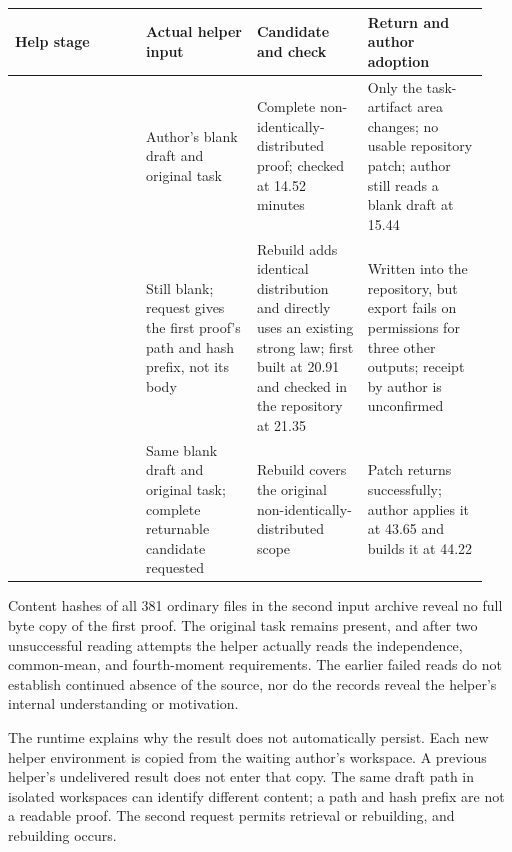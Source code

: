 \begingroup\small\setlength{\tabcolsep}{3pt}\renewcommand{\arraystretch}{1.14}
\par\nopagebreak\medskip\noindent\begin{minipage}[t]{\linewidth}
\begin{tabular}{>{\raggedright\arraybackslash}p{0.26\linewidth}>{\raggedright\arraybackslash}p{0.22\linewidth}>{\raggedright\arraybackslash}p{0.22\linewidth}>{\raggedright\arraybackslash}p{0.24\linewidth}}
\toprule
\textbf{Help stage} & \textbf{Actual helper input} & \textbf{Candidate and check} & \textbf{Return and author adoption}\\\midrule

{First} & {Author's blank draft and original task} & {Complete non-identically-distributed proof; checked at 14.52 minutes} & {Only the task-artifact area changes; no usable repository patch; author still reads a blank draft at 15.44}\\
{Second} & {Still blank; request gives the first proof's path and hash prefix, not its body} & {Rebuild adds identical distribution and directly uses an existing strong law; first built at 20.91 and checked in the repository at 21.35} & {Written into the repository, but export fails on permissions for three other outputs; receipt by author is unconfirmed}\\
{Third} & {Same blank draft and original task; complete returnable candidate requested} & {Rebuild covers the original non-identically-distributed scope} & {Patch returns successfully; author applies it at 43.65 and builds it at 44.22}\\
\bottomrule\end{tabular}\end{minipage}\par\medskip\endgroup
Content hashes of all 381 ordinary files in the second input archive reveal no full byte copy of the first proof. The original task remains present, and after two unsuccessful reading attempts the helper actually reads the independence, common-mean, and fourth-moment requirements. The earlier failed reads do not establish continued absence of the source, nor do the records reveal the helper's internal understanding or motivation.

The runtime explains why the result does not automatically persist. Each new helper environment is copied from the waiting author's workspace. A previous helper's undelivered result does not enter that copy. The same draft path in isolated workspaces can identify different content; a path and hash prefix are not a readable proof. The second request permits retrieval or rebuilding, and rebuilding occurs.

